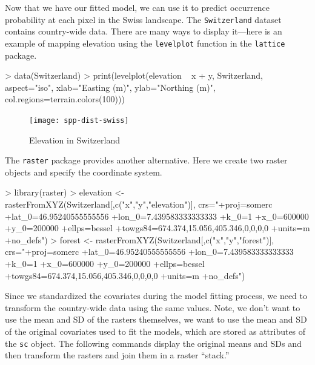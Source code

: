 \documentclass[a4paper]{article}
\renewenvironment{Schunk}{\vspace{\topsep}}{\vspace{\topsep}}
\begin{document}
Now that we have our fitted model, we can use it to predict occurrence
probability at each pixel in the Swiss landscape. The \verb+Switzerland+
dataset contains country-wide data. There are many ways to display
it---here is an example of mapping elevation using the
\verb+levelplot+ function in the \texttt{lattice} package.

\begin{Schunk}
\begin{Sinput}
> data(Switzerland)
> print(levelplot(elevation ~ x + y, Switzerland, aspect="iso",
                 xlab="Easting (m)", ylab="Northing (m)",
                 col.regions=terrain.colors(100)))
\end{Sinput}
\end{Schunk}
\begin{figure}
  \centering
  \texttt{[image: spp-dist-swiss]}
  \caption{Elevation in Switzerland}
  \label{fig:swiss}
\end{figure}

The \texttt{raster} package \citep{hijmans_vanEtten:2012}
provides another alternative. Here we create two raster objects and
specify the coordinate system.

\begin{Schunk}
\begin{Sinput}
> library(raster)
> elevation <- rasterFromXYZ(Switzerland[,c("x","y","elevation")],
     crs="+proj=somerc +lat_0=46.95240555555556 +lon_0=7.439583333333333 +k_0=1 +x_0=600000 +y_0=200000 +ellps=bessel +towgs84=674.374,15.056,405.346,0,0,0,0 +units=m +no_defs")
> forest <- rasterFromXYZ(Switzerland[,c("x","y","forest")],
     crs="+proj=somerc +lat_0=46.95240555555556 +lon_0=7.439583333333333 +k_0=1 +x_0=600000 +y_0=200000 +ellps=bessel +towgs84=674.374,15.056,405.346,0,0,0,0 +units=m +no_defs")
\end{Sinput}
\end{Schunk}

Since we standardized the covariates during the model fitting process,
we need to transform the country-wide data using the same
values. Note, we don't want to use the mean and SD of the rasters
themselves, we want to use the mean and SD of the original covariates
used to fit the models, which are stored as attributes of the
\verb+sc+ object. The following commands display the original means
and SDs and then transform the rasters and join them in a raster
``stack.''
\end{document}
